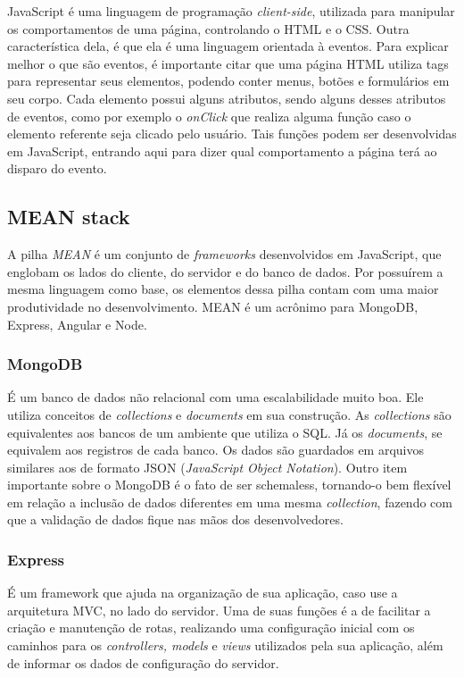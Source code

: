 \documentclass[
	12pt,				%
	oneside,			%
	a4paper,			%
	brazil				%
]{abntex2}
\begin{document}
JavaScript é uma linguagem de programação \textit{client-side}, utilizada para manipular os comportamentos de uma página, controlando o HTML e o CSS. Outra característica dela, é que ela é uma linguagem orientada à eventos.
Para explicar melhor o que são eventos, é importante citar que uma página HTML utiliza tags para representar seus elementos, podendo conter menus, botões e formulários em seu corpo. Cada elemento possui alguns atributos, sendo alguns desses atributos de eventos, como por exemplo o \textit{onClick} que realiza alguma função caso o elemento referente seja clicado pelo usuário.
Tais funções podem ser desenvolvidas em JavaScript, entrando aqui para dizer qual comportamento a página terá ao disparo do evento.\\

\subsection{MEAN stack}

A pilha \textit{MEAN} é um conjunto de \textit{frameworks} desenvolvidos em JavaScript, que englobam os lados do cliente, do servidor e do banco de dados. Por possuírem a mesma linguagem como base, os elementos dessa pilha contam com uma maior produtividade no desenvolvimento. MEAN é um acrônimo para MongoDB, Express, Angular e Node.


\subsubsection{MongoDB}

É um banco de dados não relacional com uma escalabilidade muito boa. Ele utiliza conceitos de \textit{collections} e \textit{documents} em sua construção. 
As \textit{collections} são equivalentes aos bancos de um ambiente que utiliza o SQL. Já os \textit{documents}, se equivalem aos registros de cada banco.
Os dados são guardados em arquivos similares aos de formato JSON (\textit{JavaScript Object Notation}).
Outro item importante sobre o MongoDB é o fato de ser schemaless, tornando-o bem flexível em relação a inclusão de dados diferentes em uma mesma \textit{collection}, fazendo com que a validação de dados fique nas mãos dos desenvolvedores.


\subsubsection{Express}

É um framework que ajuda na organização de sua aplicação, caso use a arquitetura MVC, no lado do servidor. Uma de suas funções é a de facilitar a criação e manutenção de rotas, realizando uma configuração inicial com os caminhos para os \textit{controllers, models} e \textit{views} utilizados pela sua aplicação, além de informar os dados de configuração do servidor.
\end{document}
